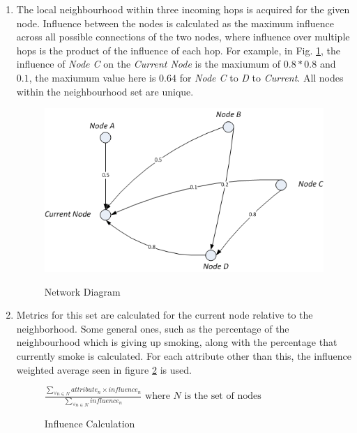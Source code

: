 \documentclass[]{article}
\begin{document}
\begin{enumerate}
\item The local neighbourhood within three incoming hops is acquired for the given node. Influence between the nodes is calculated as the maximum influence across all possible connections of the two nodes, where influence over multiple hops is the product of the influence of each hop. For example, in Fig. \ref{networkdiag}, the influence of \emph{Node C} on the \emph{Current Node} is the maxiumum of $0.8 * 0.8$ and $0.1$, the maxiumum value here is $0.64$ for \emph{Node C} to \emph{D} to \emph{Current}. All nodes within the neighbourhood set are unique.
\begin{figure}[h]
\begin{center}
\includegraphics{networkdiag.png}
\label{networkdiag}
\caption{Network Diagram}
\end{center}
\end{figure}

\item Metrics for this set are calculated for the current node relative to the neighborhood. Some general ones, such as the percentage of the neighbourhood which is giving up smoking, along with the percentage that currently smoke is calculated. For each attribute other than this, the influence weighted average seen in figure \ref{inf} is used.
\begin{figure}[h]
	\begin{center}
		\begin{math}
		\frac{\sum_{\forall n \in N} attribute_{n} \times influence_{n}}{\sum_{\forall n \in N} influence_{n}} \text{ where } N \text{ is the set of nodes}
		\end{math}
	\end{center}
	\label{inf}
	\caption{Influence Calculation}
\end{figure}



\end{enumerate}
\end{document}
